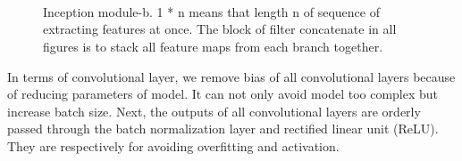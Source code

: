 \begin{figure}[H]
    \centering
    \\
    \centering
    \\
    \centering
    \\
    \captionsetup{labelfont=bf}
    \renewcommand{\baselinestretch}{1.0}
    \caption[Structrue of detailed modules]{Inception module-b. 1 * n means that length n of sequence of extracting features at once.  The block of filter concatenate in all figures is to stack all feature maps from each branch together.}
    \label{f9}
\end{figure}

In terms of convolutional layer, we remove bias of all convolutional layers because of reducing parameters of model. It can not only avoid model too complex but increase batch size. Next, the outputs of all convolutional layers are orderly passed through the batch normalization layer and rectified linear unit (ReLU). They are respectively for avoiding overfitting and activation.

